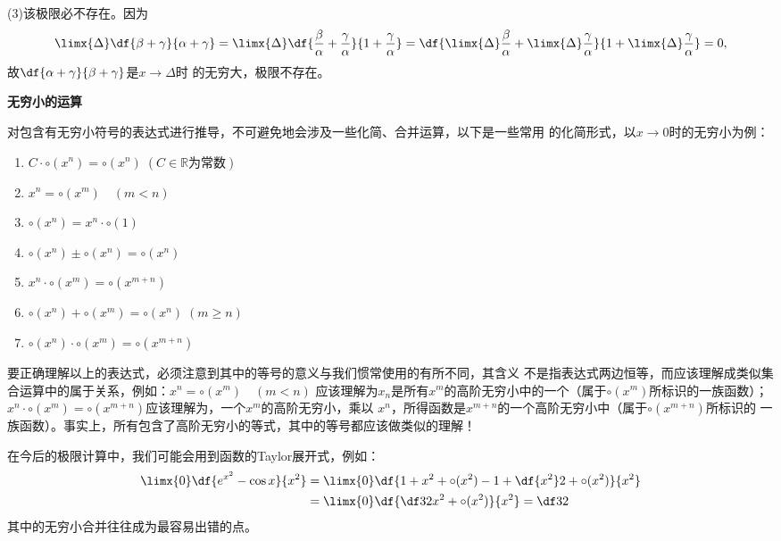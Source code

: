(3)该极限必不存在。因为
\begin{align*}
	\limx{\Delta}\df{\beta+\gamma}{\alpha+\gamma}
	=\limx{\Delta}\df
	{\frac{\beta}{\alpha}+\frac{\gamma}{\alpha}}
	{1+\frac{\gamma}{\alpha}}
	=\df{\limx{\Delta}\frac{\beta}{\alpha}
	+\limx{\Delta}\frac{\gamma}{\alpha}}
	{1+\limx{\Delta}\frac{\gamma}{\alpha}}
	=0,
\end{align*}
故$\df{\alpha+\gamma}{\beta+\gamma}$是$x\to\Delta$时
的无穷大，极限不存在。
\fin

\begin{shaded}
	{\bf 无穷小的运算}
	
	对包含有无穷小符号的表达式进行推导，不可避免地会涉及一些化简、合并运算，以下是一些常用
	的化简形式，以$x\to 0$时的无穷小为例：
	\begin{tcolorbox}
		\begin{enumerate}[(1)]
	  	  \item $C\cdot\circ(x^n)=\circ(x^n)\;(C\in\mathbb{R}\mbox{为常数})$
		  \item $x^n=\circ(x^m)\quad (m<n)$ 
		  \item $\circ(x^n)=x^n\cdot\circ(1)$
		  \item $\circ(x^n)\pm\circ(x^n)=\circ(x^n)$
		  \item $x^n\cdot\circ(x^m)=\circ(x^{m+n})$ 
		  \item $\circ(x^n)+\circ(x^m)=\circ(x^n)\;(m\geq n)$  
		  \item $\circ(x^n)\cdot\circ(x^m)=\circ(x^{m+n})$
		\end{enumerate}
	\end{tcolorbox}
	要正确理解以上的表达式，必须注意到其中的等号的意义与我们惯常使用的有所不同，其含义
	不是指表达式两边恒等，而应该理解成类似集合运算中的属于关系，例如：$x^n=\circ(x^m)\quad (m<n)$ 
	应该理解为$x_n$是所有$x^m$的高阶无穷小中的一个（属于$\circ(x^m)$所标识的一族函数）；
	$x^n\cdot\circ(x^m)=\circ(x^{m+n})$应该理解为，一个$x^m$的高阶无穷小，乘以
	$x^n$，所得函数是$x^{m+n}$的一个高阶无穷小中（属于$\circ(x^{m+n})$所标识的
	一族函数）。事实上，所有包含了高阶无穷小的等式，其中的等号都应该做类似的理解！
	
	在今后的极限计算中，我们可能会用到函数的Taylor展开式，例如：
	\begin{align}
		\limx{0}\df{e^{x^2}-\cos x}{x^2}&=\limx{0}
		\df{1+x^2+\circ(x^2)-1+\df{x^2}2+\circ(x^2)}{x^2}\notag\\
		&=\limx{0}\df{\df32x^2+\circ(x^2)}{x^2}=\df32\notag
	\end{align}
	其中的无穷小合并往往成为最容易出错的点。
\end{shaded}

